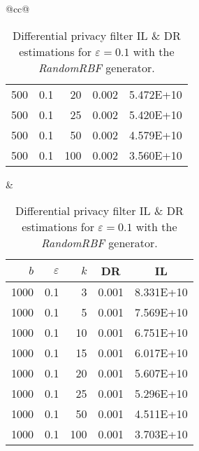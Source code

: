 \begin{table}[H]
\begin{tabular}{@{}cc@{}}
\begin{tabular}{@{}rrrrr@{}}
			500	&	0.1	&	20	&	0.002	&	5.472E+10 \\
			500	&	0.1	&	25	&	0.002	&	5.420E+10 \\
			500	&	0.1	&	50	&	0.002	&	4.579E+10 \\
			500	&	0.1	&	100	&	0.002	&	3.560E+10 \\
		\end{tabular}
		&
		\begin{tabular}{@{}rrrrr@{}}
			\toprule
			$b$ & $\varepsilon$ & $k$ & \multicolumn{1}{c}{DR} & \multicolumn{1}{c}{IL} \\ \midrule
			1000	&	0.1	&	3	&	0.001	&	8.331E+10 \\
			1000	&	0.1	&	5	&	0.001	&	7.569E+10 \\
			1000	&	0.1	&	10	&	0.001	&	6.751E+10 \\
			1000	&	0.1	&	15	&	0.001	&	6.017E+10 \\
			1000	&	0.1	&	20	&	0.001	&	5.607E+10 \\
			1000	&	0.1	&	25	&	0.001	&	5.296E+10 \\
			1000	&	0.1	&	50	&	0.001	&	4.511E+10 \\
			1000	&	0.1	&	100	&	0.001	&	3.703E+10 \\
		\end{tabular}
	\end{tabular}
	\caption[Differential privacy filter DR \& IL estimations (RandomRBF), $\varepsilon = 0.1$.]{Differential privacy filter IL \& DR estimations for $\varepsilon = 0.1$ with the \textit{RandomRBF} generator.}
	\label{table:results-wave-diff-priv-e0.1}
\end{table}

